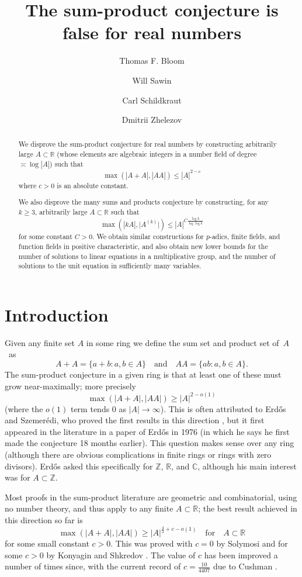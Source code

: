 \documentclass{amsart}
\title{The sum-product conjecture is false for real numbers}
\author{Thomas F. Bloom}
\author{Will Sawin}
\author{Carl Schildkraut}
\author{Dmitrii Zhelezov}
\numberwithin{equation}{section}
\newcommand{\bbz}{\mathbb{Z}}
\newcommand{\abs}[1]{\mathopen{}\left| #1\mathclose{}\right|}
\newcommand{\bbr}{\mathbb{R}}
\newcommand{\bbc}{\mathbb{C}}
\newcommand{\Abs}[1]{\lvert #1\rvert}
\begin{document}
\begin{abstract}
We disprove the sum-product conjecture for real numbers by constructing arbitrarily large $A\subset \bbr$  (whose elements are algebraic integers in a number field of degree $\asymp \log\abs{A}$) such that
\[\max(\abs{A+A},\abs{AA})\leq \abs{A}^{2-c}\]
where $c>0$ is an absolute constant.

We also disprove the many sums and products conjecture by constructing, for any $k\geq 3$, arbitrarily large $A\subset \bbr$ such that
\[\max(\abs{kA},\Abs{A^{(k)}})\leq \abs{A}^{C\frac{\log k}{\log\log k}}\]
for some constant $C>0$. We obtain similar constructions for $p$-adics, finite fields, and function fields in positive characteristic, and also obtain new lower bounds for the number of solutions to linear equations in a multiplicative group, and the number of solutions to the unit equation in sufficiently many variables.
\end{abstract}
\maketitle

\section{Introduction}
Given any finite set $A$ in some ring we define the sum set and product set of~$A$~as 
\[A+A=\{a+b: a,b\in A\}\quad\textrm{and}\quad AA=\{ ab : a,b\in A\}.\]
The sum-product conjecture in a given ring is that at least one of these must grow near-maximally; more precisely
\begin{equation}\label{eq-sp}\max(\abs{A+A},\abs{AA})\geq \abs{A}^{2-o(1)}\end{equation}
(where the $o(1)$ term tends $0$ as $\abs{A}\to \infty$). This is often attributed to Erd\H{o}s and Szemer\'{e}di, who proved the first results in this direction \cite{ErSz83}, but it first appeared in the literature in a paper of Erd\H{o}s in 1976 \cite{Er76} (in which he says he first made the conjecture 18 months earlier). This question makes sense over any ring (although there are obvious complications in finite rings or rings with zero divisors). Erd\H{o}s \cite{Er76} asked this specifically for $\bbz$, $\bbr$, and $\bbc$, although his main interest was for $A\subset \bbz$.

Most proofs in the sum-product literature are geometric and combinatorial, using no number theory, and thus apply to any finite $A\subset \bbr$; the best result achieved in this direction so far is
\[\max(\abs{A+A},\abs{AA})\geq \abs{A}^{\frac{4}{3}+c-o(1)}\quad\textrm{for}\quad A\subset \bbr\]
for some small constant $c>0$. This was proved with $c=0$ by Solymosi \cite{So09} and for some $c>0$ by Konyagin and Shkredov \cite{KoSh16}. The value of $c$ has been improved a number of times since, with the current record of $c=\frac{10}{4407}$ due to Cushman \cite{Cu25}. 
\end{document}
